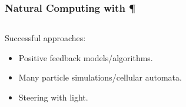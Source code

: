 \documentclass[	hyperref={pdfpagelabels=false}, xcolor=dvipsnames,
		11pt]{beamer}
\begin{document}
\begin{frame}
    \frametitle{Natural Computing with \P} 

	\begin{columns}
	\begin{column}{4.6cm}

	\begin{overprint}

		\begin{block}{Successful approaches:}
		  \begin{itemize}
		   \item<1-> Positive feedback models/algorithms.
		   \item<2-> Many particle simulations/cellular automata. 
		   \item<3-> Steering with light.
		  \end{itemize}
		\end{block}

	\end{overprint}

	\end{column}

	\begin{column}{5cm}
	\begin{overprint}

	\testbox{
	\begin{minipage}[t]{5 cm}


\end{minipage}}
\end{overprint}
\end{column}
\end{columns}
\end{frame}
\end{document}
